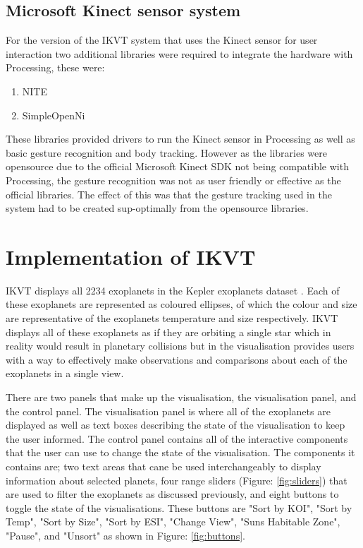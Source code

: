 \subsection{Microsoft Kinect sensor system}
For the version of the IKVT system that uses the Kinect sensor for user
interaction two additional libraries were required to integrate the hardware
with Processing, these were:
\begin{enumerate}
 \item NITE \cite{nite}
 \item SimpleOpenNi \cite{simpleopenni}
\end{enumerate}
These libraries provided drivers to run the Kinect sensor in Processing as well
as basic gesture recognition and body tracking. However as the libraries were
opensource due to the official Microsoft Kinect SDK not being compatible with
Processing, the gesture recognition was not as user friendly or effective as the
official libraries. The effect of this was that the gesture tracking used in the
system had to be created sup-optimally from the opensource libraries. 

\section{Implementation of IKVT}

IKVT displays all 2234 exoplanets
in the Kepler exoplanets dataset \cite{dataset}. Each of these exoplanets are
represented as coloured
ellipses, of which the colour and size are representative of the exoplanets
temperature and size respectively. IKVT displays all of these exoplanets as if
they are orbiting a single star which in reality would result in planetary
collisions but in the visualisation provides users with a way to effectively
make observations and comparisons about each of the exoplanets in a single
view. 

There are two panels that make up the visualisation, the visualisation panel,
and the control panel. The visualisation panel is where all of the exoplanets
are displayed as well as text boxes describing the state of the visualisation to
keep the user informed. The control panel contains all of the interactive
components that the user can use to change the state of the visualisation. The
components it contains are; two text areas that cane be used interchangeably to
display information about selected planets, four range sliders (Figure:
\ref{fig:sliders}) that are used to
filter the exoplanets as discussed previously, and eight buttons to toggle the
state of the visualisations. These buttons are "Sort by KOI", "Sort by Temp",
"Sort by Size", "Sort by ESI", "Change View", "Suns Habitable Zone", "Pause",
and "Unsort" as shown in Figure: \ref{fig:buttons}. 

